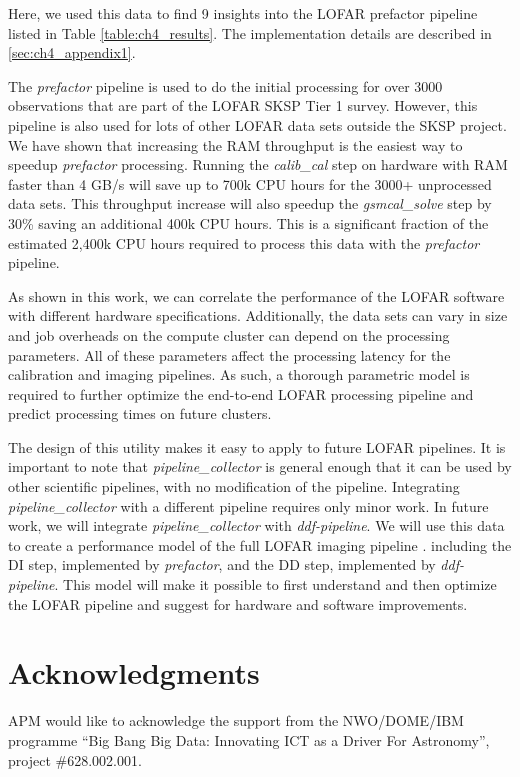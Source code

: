 Here, we used this data to find 9 insights into the LOFAR prefactor pipeline listed in Table \ref{table:ch4_results}. The implementation details are described in \ref{sec:ch4_appendix1}.

The \textit{prefactor} pipeline is used to do the initial processing for over 3000 observations that are part of the LOFAR SKSP Tier 1 survey. However, this pipeline is also used for lots of other LOFAR data sets outside the SKSP project. We have shown that increasing the RAM throughput is the easiest way to speedup \textit{prefactor} processing. Running the \textit{calib\_cal} step on hardware with RAM faster than 4 GB/s will save up to 700k CPU hours for the 3000+ unprocessed data sets. This throughput increase will also speedup the \textit{gsmcal\_solve} step by 30\% saving an additional 400k CPU hours. This is a significant fraction of the estimated 2,400k CPU hours required to process this data with the \textit{prefactor} pipeline. 

As shown in this work, we can correlate the performance of the LOFAR software with different hardware specifications. Additionally, the data sets  can vary in size and job overheads on the compute cluster can depend on the processing parameters. All of these parameters affect the processing latency for the calibration and imaging pipelines. As such, a thorough parametric model is required to further optimize the end-to-end LOFAR processing pipeline and predict processing times on future clusters.

The design of this utility makes it easy to apply to future LOFAR pipelines. It is important to note that \textit{pipeline\_collector} is general enough that it can be used by other scientific pipelines, with no modification of the pipeline. Integrating \textit{pipeline\_collector} with a different pipeline requires only minor work. In future work, we will integrate \textit{pipeline\_collector} with \textit{ddf-pipeline}. We will use this data to create a performance model of the full LOFAR imaging pipeline \citep{lofar_prefactor,Wendy_bootes,tassesmirnov}.  including the DI step, implemented by \textit{prefactor}, and  the DD step, implemented by \textit{ddf-pipeline}. This model will make it possible to first understand and then optimize the LOFAR pipeline and suggest for hardware and software improvements. 



\section*{Acknowledgments}
APM would like to acknowledge the support from the NWO/DOME/IBM programme ``Big Bang Big Data: Innovating ICT as a Driver For Astronomy'', project \#628.002.001.

